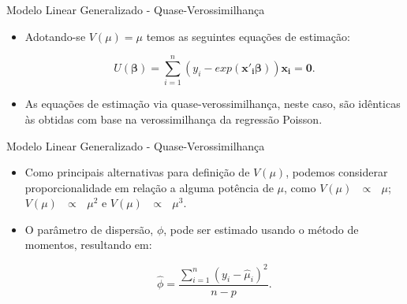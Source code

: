 \documentclass[10pt, aspectratio=169]{beamer}
\begin{document}




\begin{frame}{Modelo Linear Generalizado - Quase-Verossimilhança} 

\begin{itemize}




\item Adotando-se $V(\mu)=\mu$ temos as seguintes equações de estimação:



$$U(\boldsymbol{\beta}) =\sum_{i=1}^{n}(y_{i}-exp(\boldsymbol{x'_{i}\beta}))\boldsymbol{x_{i}=0}.$$


\vspace{0.5cm}

\item As equações de estimação via quase-verossimilhança, neste caso, são idênticas às obtidas com base na verossimilhança da regressão Poisson.



\end{itemize}

\end{frame}






\begin{frame}{Modelo Linear Generalizado - Quase-Verossimilhança} 

\begin{itemize}



\item Como principais alternativas para definição de $V(\mu)$, podemos considerar proporcionalidade em relação a alguma potência de $\mu$, como $V(\mu) \text{ } \propto \text{ } \mu$; $V(\mu)\text{ } \propto \text{ } \mu^2$ e $V(\mu) \text{ } \propto \text{ } \mu^3$.

\vspace{0.5cm}

\item O parâmetro de dispersão, $\phi$, pode ser estimado usando o método de momentos, resultando em:

\vspace{0.5cm}

$$ \hat{\phi}=\frac{\sum_{i=1}^{n} (y_{i}-\hat{\mu}_{i})^{2}}{n-p}. $$


\end{itemize}

\end{frame}
\end{document}
